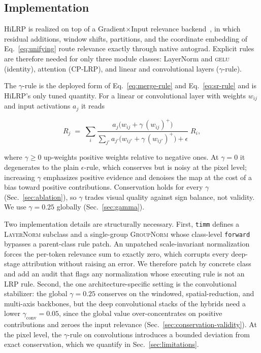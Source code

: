 \documentclass[lettersize,journal]{IEEEtran}
\theoremstyle{definition}
\theoremstyle{plain}
\begin{document}
\subsection{Implementation}
\label{sec:implementation}
HiLRP is realized on top of a Gradient$\times$Input relevance backend~\cite{achtibat2024attnlrp}, in which residual additions, window shifts, partitions, and the coordinate embedding of Eq.~\eqref{eq:unifying} route relevance exactly through native autograd. Explicit rules are therefore needed for only three module classes: LayerNorm and \textsc{gelu} (identity), attention (CP-LRP), and linear and convolutional layers ($\gamma$-rule).

The $\gamma$-rule is the deployed form of Eq.~\eqref{eq:merge-rule} and
Eq.~\eqref{eq:sr-rule} and is HiLRP's only tuned quantity. For a linear or convolutional layer with weights $w_{ij}$ and input activations $a_j$ it reads

\begin{equation}
\label{eq:gamma-rule}
R_j \;=\; \sum_i
\frac{a_j\big(w_{ij}+\gamma\,(w_{ij})^{+}\big)}
     {\sum_{j'} a_{j'}\big(w_{ij'}+\gamma\,(w_{ij'})^{+}\big)+\epsilon}\;R_i ,
\end{equation}

where $\gamma\ge 0$ up-weights positive weights relative to negative ones. At $\gamma{=}0$ it degenerates to the plain $\epsilon$-rule, which conserves but is noisy at the pixel level; increasing $\gamma$ emphasizes positive evidence and denoises the map at the cost of a bias toward positive contributions. Conservation holds for every $\gamma$ (Sec.~\ref{sec:ablation}), so $\gamma$ trades visual quality against sign balance, not validity. We use $\gamma{=}0.25$ globally
(Sec.~\ref{sec:gamma}).

Two implementation details are structurally necessary. First, \texttt{timm} defines a \textsc{LayerNorm} subclass and a single-group \textsc{GroupNorm} whose class-level \texttt{forward} bypasses a parent-class rule patch. An unpatched scale-invariant normalization forces the per-token relevance sum to exactly zero, which corrupts every deep-stage attribution without raising an error. We therefore patch by concrete class and add an audit that flags any normalization whose executing rule is not an LRP rule. Second, the one architecture-specific setting is the convolutional stabilizer: the global $\gamma{=}0.25$ conserves on the windowed, spatial-reduction, and multi-axis backbones, but the deep convolutional stacks of the hybrids need a lower $\gamma_{\text{conv}}{=}0.05$, since the global value over-concentrates on positive contributions and zeroes the input relevance (Sec.~\ref{sec:conservation-validity}). At the pixel level, the $\gamma$-rule on convolutions introduces a bounded deviation from exact conservation, which we quantify in Sec.~\ref{sec:limitations}.
\end{document}
